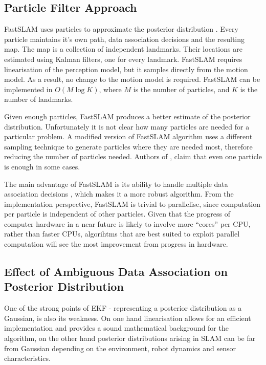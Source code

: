\subsection{Particle Filter Approach}
FastSLAM uses particles to approximate the posterior distribution
\cite{fastslam}. Every particle maintains it's own path, data
association decisions and the resulting map. The map is a collection
of independent landmarks. Their locations are estimated using Kalman
filters, one for every landmark. FastSLAM requires linearisation of
the perception model, but it samples directly from the motion model.
As a result, no change to the motion model is required. FastSLAM can
be implemented in $O(M\log K)$, where $M$ is the number of particles,
and $K$ is the number of landmarks.

Given enough particles, FastSLAM produces a better estimate of the
posterior distribution.  Unfortunately it is not clear how many
particles are needed for a particular problem. A modified version of
FastSLAM algorithm \cite{fastslam2} uses a different sampling
technique to generate particles where they are needed most, therefore
reducing the number of particles needed. Authors of \cite{fastslam2},
claim that even one particle is enough in some cases.

The main advantage of FastSLAM is its ability to handle multiple data
association decisions \cite{Montemerlo2003}, which makes it a more
robust algorithm. From the implementation perspective, FastSLAM is
trivial to parallelise, since computation per particle is independent
of other particles. Given that the progress of computer hardware in a
near future is likely to involve more ``cores'' per CPU, rather than
faster CPUs, algorihtms that are best suited to exploit parallel
computation will see the most improvement from progress in hardware.


\subsection{Effect of Ambiguous Data Association on Posterior
  Distribution}
\label{sec:AmbiguousDA}

One of the strong points of EKF - representing a posterior
distribution as a Gaussian, is also its weakness. On one hand
linearisation allows for an efficient implementation and provides a
sound mathematical background for the algorithm, on the other hand
posterior distributions arising in SLAM can be far from Gaussian
depending on the environment, robot dynamics and sensor
characteristics. 

